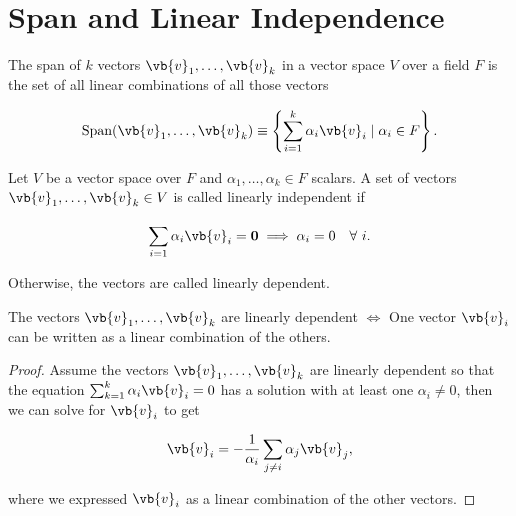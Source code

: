 \documentclass[a4paper,12pt]{report}
\begin{document}
\section{Span and Linear Independence}

\begin{definition}
    The span of \(k\) vectors \(\vb{v} _{1} , \ldots , \vb{v} _{k} \) in a vector space \(V\) over a field \(F\) is the set of all linear combinations of all those vectors
\end{definition}

\begin{equation}
    \text{Span} (\vb{v} _{1}, \ldots ,\vb{v} _{k}  ) \equiv  \left\{\sum_{i=1}^{k} \alpha _{i}\vb{v} _{i} \mid  \alpha _{i}\in F    \right\}.
\end{equation}

\begin{definition}
Let \(V\) be a vector space over \(F\) and \(\alpha _{1}, \ldots , \alpha _{k} \in  F  \) scalars. A set of vectors \(\vb{v} _{1}, \ldots , \vb{v} _{k} \in V\) is called linearly independent if 

\begin{equation}
    \sum_{i=1}^{} \alpha _{i} \vb{v} _{i} = \boldsymbol{0} \implies \alpha _{i} = 0 ~~~ \forall ~ i.      
\end{equation}

Otherwise, the vectors are called linearly dependent. 
\end{definition}

\begin{corollary}
The vectors \(\vb{v} _{1}, \ldots , \vb{v} _{k}  \) are linearly dependent \(\iff \) One vector \(\vb{v} _{i} \) can be written as a linear combination of the others. 
\end{corollary}

\begin{proof}
Assume the vectors \(\vb{v} _{1}, \ldots , \vb{v} _{k}  \) are linearly dependent so that the equation \(\sum_{k=1}^{k} \alpha _{i} \vb{v} _{i}  = 0\) has a solution with at least one \(\alpha _{i} \neq 0 \), then we can solve for \(\vb{v} _{i} \) to get

\begin{equation}
    \vb{v} _{i} = -\frac{1}{\alpha _{i} } \sum_{j \neq i}^{} \alpha _{j} \vb{v} _{j} ,    
\end{equation}

where we expressed \(\vb{v} _{i} \) as a linear combination of the other vectors.

\end{proof}
\end{document}
